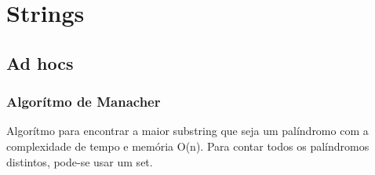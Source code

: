\section{Strings}

\subsection{Ad hocs}
\subsubsection{Algorítmo de Manacher}
Algor\'{i}tmo para encontrar a maior substring que seja um pal\'{i}ndromo com a complexidade de tempo e mem\'{o}ria O(n).
Para contar todos os palíndromos distintos, pode-se usar um set.

